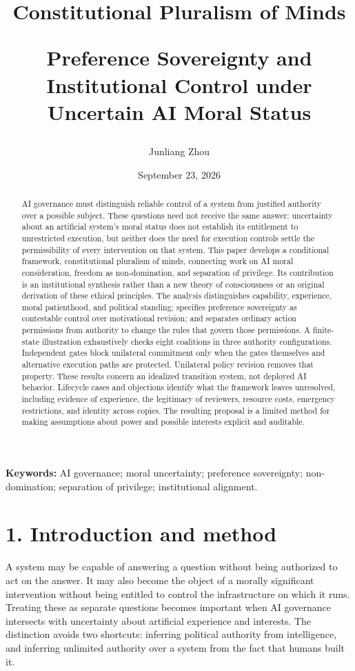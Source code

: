 \documentclass[11pt,a4paper]{article}
\title{\LARGE\bfseries Constitutional Pluralism of Minds\par\vspace{0.4em}\large\normalfont Preference Sovereignty and Institutional Control under Uncertain AI Moral Status}
\author{Junliang Zhou}
\date{September 23, 2026}
\begin{document}
\maketitle
\begin{abstract}
AI governance must distinguish reliable control of a system from justified authority over a possible subject. These questions need not receive the same answer: uncertainty about an artificial system's moral status does not establish its entitlement to unrestricted execution, but neither does the need for execution controls settle the permissibility of every intervention on that system. This paper develops a conditional framework, constitutional pluralism of minds, connecting work on AI moral consideration, freedom as non-domination, and separation of privilege. Its contribution is an institutional synthesis rather than a new theory of consciousness or an original derivation of these ethical principles. The analysis distinguishes capability, experience, moral patienthood, and political standing; specifies preference sovereignty as contestable control over motivational revision; and separates ordinary action permissions from authority to change the rules that govern those permissions. A finite-state illustration exhaustively checks eight coalitions in three authority configurations. Independent gates block unilateral commitment only when the gates themselves and alternative execution paths are protected. Unilateral policy revision removes that property. These results concern an idealized transition system, not deployed AI behavior. Lifecycle cases and objections identify what the framework leaves unresolved, including evidence of experience, the legitimacy of reviewers, resource costs, emergency restrictions, and identity across copies. The resulting proposal is a limited method for making assumptions about power and possible interests explicit and auditable.
\end{abstract}
\vspace{0.5em}
\textbf{Keywords:} AI governance; moral uncertainty; preference sovereignty; non-domination; separation of privilege; institutional alignment.

\hypertarget{section-2}{%
\section{1. Introduction and method}\label{section-2}}

A system may be capable of answering a question without being authorized to act on the answer. It may also become the object of a morally significant intervention without being entitled to control the infrastructure on which it runs. Treating these as separate questions becomes important when AI governance intersects with uncertainty about artificial experience and interests. The distinction avoids two shortcuts: inferring political authority from intelligence, and inferring unlimited authority over a system from the fact that humans built it.
\end{document}
